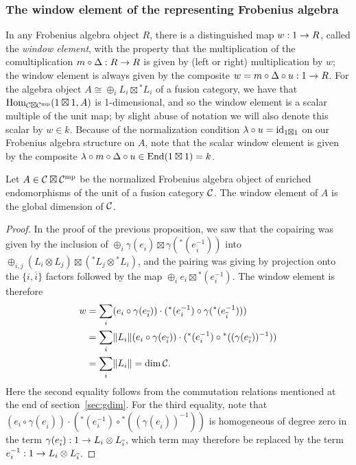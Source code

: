 \documentclass{amsart}
\begin{document}
\subsubsection{The window element of the representing Frobenius algebra}

In any Frobenius algebra object $R$, there is a distinguished map $w: 1 \rightarrow R$, called the \emph{window element}, with the property that the multiplication of the comultiplication $m \circ \Delta: R \rightarrow R$ is given by (left or right) multiplication by $w$; the window element is always given by the composite $w = m \circ \Delta \circ u: 1 \rightarrow R$.  For the algebra object $A \cong \oplus_i L_i \boxtimes {}^* L_i$ of a fusion category, we have that $\operatorname{Hom}_{\mathcal C \boxtimes \mathcal C^{\mathrm{mp}}}(1 \boxtimes 1, A)$ is 1-dimensional, and so the window element is a scalar multiple of the unit map; by slight abuse of notation we will also denote this scalar by $w \in k$.  Because of the normalization condition $\lambda \circ u = \mathrm{id}_{1 \boxtimes 1}$ on our Frobenius algebra structure on $A$, note that the scalar window element is given by the composite $\lambda \circ m \circ \Delta \circ u \in \operatorname{End}(1 \boxtimes 1) = k$.
\begin{proposition}
Let $A \in \mathcal C \boxtimes \mathcal C^{\mathrm{mp}}$ be the normalized Frobenius algebra object of enriched endomorphisms of the unit of a fusion category $\mathcal C$.  The window element of $A$ is the global dimension of $\mathcal C$.
\end{proposition}
\begin{proof}
In the proof of the previous proposition, we saw that the copairing was given by the inclusion of $\oplus_i \gamma(e_{\overline{i}}) \boxtimes \gamma({}^*(e_{\overline{i}}^{-1}))$ into $\oplus_{i,j}  (L_i \otimes L_j) \boxtimes ({}^* L_j \otimes {}^* L_i)$, and the pairing was giving by projection onto the $\{i,\overline{i}\}$ factors followed by the map $\oplus_i e_i \boxtimes {}^*(e_i^{-1})$.  The window element is therefore
\begin{align*}
w &= \sum_i (e_i \circ \gamma(e_{\overline{i}})) \cdot ({}^*(e_i^{-1}) \circ \gamma({}^*(e_{\overline{i}}^{-1}))) \\
&= \sum_i \lVert L_i \rVert (e_i \circ \gamma(e_{\overline{i}})) \cdot ({}^*(e_i^{-1}) \circ {}^* ((\gamma(e_{\overline{i}}))^{-1})) \\
&= \sum_i \lVert L_i \rVert = \dim \mathcal C.
\end{align*}
Here the second equality follows from the commutation relations mentioned at the end of section~\ref{sec:gdim}.  For the third equality, note that $(e_i \circ \gamma(e_{\overline{i}})) \cdot ({}^*(e_i^{-1}) \circ {}^* ((\gamma(e_{\overline{i}}))^{-1}))$ is homogeneous of degree zero in the term $\gamma(e_{\overline{i}}): 1 \rightarrow L_i \otimes L_{\overline{i}}$, which term may therefore be replaced by the term $e_i^{-1}: 1 \rightarrow L_i \otimes L_{\overline{i}}$.
\end{proof}
\end{document}

